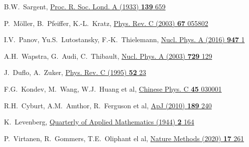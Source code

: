 \begin{thebibliography}{9}
B.W.~Sargent,
\href{https://doi.org/10.1098/rspa.1933.0045}
  {Proc. R. Soc. Lond. A (1933) \textbf{139} 659}

P.~M\"oller, B.~Pfeiffer, K.-L.~Kratz,
\href{https://link.aps.org/doi/10.1103/PhysRevC.67.055802}
  {Phys. Rev. C (2003) \textbf{67} 055802}

I.V.~Panov, Yu.S.~Lutostansky, F.-K.~Thielemann,
\href{hhttps://doi.org/10.1016/j.nuclphysa.2015.12.001}
  {Nucl. Phys. A (2016) \textbf{947} 1}

A.H.~Wapstra, G.~Audi, C.~Thibault,
\href{https://doi.org/10.1016/j.nuclphysa.2003.11.002}
  {Nucl. Phys. A (2003) \textbf{729} 129}

J.~Duflo, A.~Zuker,
\href{https://doi.org/10.1103/PhysRevC.52.R23}
  {Phys. Rev. C (1995) \textbf{52} 23}

 F.G.~Kondev, M.~Wang, W.J.~Huang et al,
 \href{https://doi.org/10.1088/1674-1137/abddae}{Chinese Phys. C \textbf{45} 030001}

R.H.~Cyburt, A.M.~Amthor, R.~Ferguson et al,
\href{https://doi.org/10.1088/0067-0049/189/1/240}
  {ApJ (2010) \textbf{189} 240}

K.~Levenberg,
\href{https://doi.org/10.1090/qam/10666}
  {Quarterly of Applied Mathematics (1944) \textbf{2} 164}

P.~Virtanen, R.~Gommers, T.E.~Oliphant el al,
\href{https://doi.org/10.1038/s41592-019-0686-2}
  {Nature Methods (2020) \textbf{17} 261}
\end{thebibliography}
